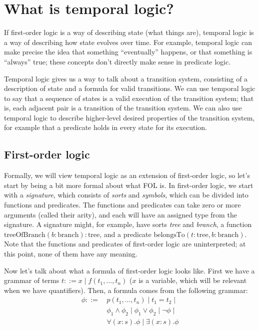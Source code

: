 \documentclass{scrbook}
\begin{document}
\chapter{What is temporal logic?}

If first-order logic is a way of describing state (what things are), temporal logic
is a way of describing how state evolves over time. For example, temporal logic
can make precise the idea that something ``eventually'' happens, or that
something is ``always'' true; these concepts don't directly make sense in
predicate logic.

Temporal logic gives us a way to talk about a transition system, consisting of a
description of state and a formula for valid transitions. We can use temporal
logic to say that a sequence of states is a valid execution of the transition
system; that is, each adjacent pair is a transition of the transition system. We
can also use temporal logic to describe higher-level desired properties of the
transition system, for example that a predicate holds in every state for its
execution.

\section{First-order logic}

Formally, we will view temporal logic as an extension of first-order logic, so
let's start by being a bit more formal about what FOL is. In first-order logic,
we start with a \emph{signature}, which consists of \emph{sorts} and
\emph{symbols}, which can be divided into functions and predicates. The
functions and predicates can take zero or more arguments (called their arity),
and each will have an assigned type from the signature. A signature
might, for example, have sorts \emph{tree} and \emph{branch}, a function
$\mathrm{treeOfBranch}(b: \mathrm{branch}) : \mathrm{tree}$, and a predicate
$\mathrm{belongsTo}(t: \mathrm{tree}, b: \mathrm{branch})$. Note that the
functions and predicates of first-order logic are uninterpreted; at this point,
none of them have any meaning.

Now let's talk about what a formula of first-order logic looks like. First we
have a grammar of terms $t ::= x \mid f(t_1, \dots, t_n)$ ($x$ is a variable,
which will be relevant when we have quantifiers). Then, a formula comes
from the following grammar:
\begin{align*}
  \phi ::= \, &p(t_1, \dots, t_n) \mid t_1 = t_2 \mid \\
  &\phi_1 \land \phi_2 \mid \phi_1 \lor \phi_2 \mid \lnot \phi \mid \\
  &\forall (x:s). \phi \mid \exists (x:s). \phi
\end{align*}
\end{document}
